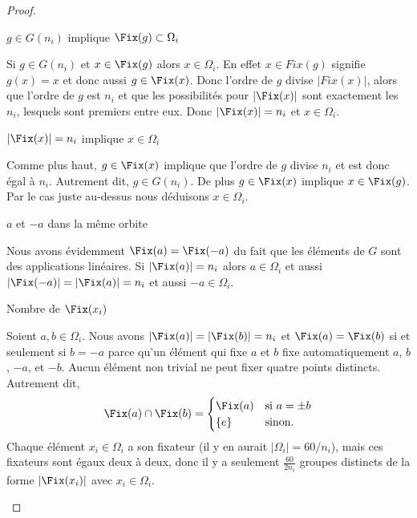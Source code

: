 \begin{proof}
\begin{subproof}
            \item[\( g\in G(n_i)\) implique \( \Fix(g)\subset \Omega_i\)]

                Si \( g\in G(n_i)\) et \( x\in\Fix(g)\) alors \( x\in \Omega_i\). En effet \( x\in Fix(g)\) signifie \( g(x)=x\) et donc aussi \( g\in\Fix(x)\). Donc l'ordre de \( g\) divise \( | Fix(x) |\), alors que l'ordre de \( g\) est \( n_i\) et que les possibilités pour \( | \Fix(x) |\) sont exactement les \( n_i\), lesquels sont premiers entre eux. Donc \( | \Fix(x) |=n_i\) et \( x\in \Omega_i\).

            \item[\( | \Fix(x) |=n_i\) implique \( x\in \Omega_i\)]

                Comme plus haut, \( g\in\Fix(x)\) implique que l'ordre de \( g\) divise \( n_i\) et est donc égal à \( n_i\). Autrement dit, \( g\in G(n_i)\). De plus \( g\in\Fix(x)\) implique \( x\in\Fix(g)\). Par le cas juste au-dessus nous déduisons \( x\in\Omega_i\).

            \item[\( a\) et \( -a\) dans la même orbite]

                Nous avons évidemment \( \Fix(a)=\Fix(-a)\) du fait que les éléments de \( G\) sont des applications linéaires. Si \( | \Fix(a) |=n_i\) alors \( a\in\Omega_i\) et aussi \( | \Fix(-a) |=| \Fix(a) |=n_i \) et aussi \( -a\in \Omega_i\).

            \item[Nombre de \( \Fix(x_i)\)]

                Soient \( a,b\in \Omega_i\). Nous avons \( | \Fix(a) |=| \Fix(b) |=n_i\) et \( \Fix(a)=\Fix(b)\) si et seulement si \( b=-a\) parce qu'un élément qui fixe \( a\) et \( b\) fixe automatiquement \( a\), \( b\), \( -a\), et \( -b\). Aucun élément non trivial ne peut fixer quatre points distincts. Autrement dit,
                \begin{equation}
                    \Fix(a)\cap\Fix(b)=\begin{cases}
                        \Fix(a)    &   \text{si } a=\pm b\\
                        \{ e \}    &    \text{sinon. }
                    \end{cases}
                \end{equation}
                Chaque élément \( x_i\in \Omega_i\) a son fixateur (il y en aurait \( | \Omega_i |=60/n_i\)), mais ces fixateurs sont égaux deux à deux, donc il y a seulement \( \frac{ 60 }{ 2n_i }\) groupes distincts de la forme \( | \Fix(x_i) |\) avec \( x_i\in \Omega_i\).


\end{subproof}
\end{proof}
